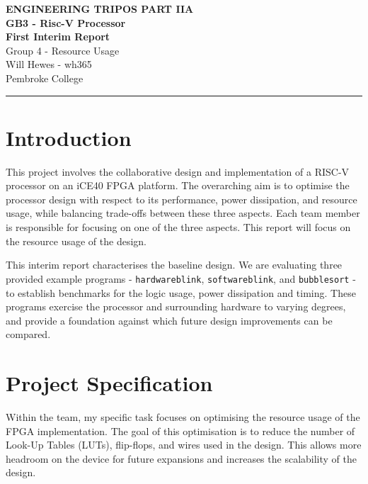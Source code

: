 \documentclass[a4paper,10pt]{article}
\renewcommand{\maketitle}{
    \begin{center}
        \LARGE \textbf{ENGINEERING TRIPOS PART IIA} \\ 
        \vspace{0.5em}
        \Large \textbf{GB3 - Risc-V Processor} \\ 
        \vspace{0.5em}
        \textbf{First Interim Report} \\
        \large Group 4 - Resource Usage \\
        \vspace{1em}
        \large Will Hewes - wh365 \\ 
        Pembroke College \\ 
        \vspace{0.5em}
    \end{center}
}
\begin{document}
\maketitle
\hrule
\tableofcontents
\newpage

\section{Introduction}
\label{sec:Introduction}

This project involves the collaborative design and implementation 
of a RISC-V processor on an iCE40 FPGA platform. 
The overarching aim is to optimise 
the processor design with respect to its 
performance, power dissipation, and resource usage, 
while balancing trade-offs between these three aspects. 
Each team member is responsible for focusing on one of the three aspects.
This report will focus on the resource usage of the design.

This interim report characterises the baseline design. 
We are evaluating three provided example programs - 
\texttt{hardwareblink}, \texttt{softwareblink}, and \texttt{bubblesort} - 
to establish benchmarks for the logic usage, power dissipation and timing. 
These programs exercise the processor and surrounding hardware to varying degrees, 
and provide a foundation against which future design improvements can be compared.


\section{Project Specification}
\label{sec:Project_Specification}

Within the team, my specific task focuses on 
optimising the resource usage of the FPGA implementation. 
The goal of this optimisation is to reduce the number of 
Look-Up Tables (LUTs), flip-flops, and wires used in the design. 
This allows more headroom on the device for future expansions 
and increases the scalability of the design.


\iffalse
LUTs, flip-flops, and routing wires are 
the fundamental building blocks of digital logic in an FPGA. 
A LUT is a configurable logic element that can implement 
arbitrary combinational logic functions 
by storing precomputed outputs for each possible input combination. 
Flip-flops are used to store single bits of state and 
are essential for implementing sequential logic, 
such as registers and control signals. 
Routing wires connect LUTs and flip-flops together, 
allowing signals to propagate through the design. 
The quantity and efficiency of these elements directly impact 
how much logic the FPGA can implement and how complex the system can be.
\fi
\end{document}
